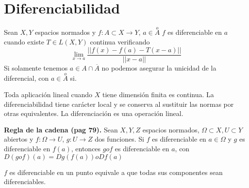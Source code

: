 \section{Diferenciabilidad}
Sean $X,Y$ espacios normados y $f:A\subset X\rightarrow Y$, $a\in\overset{o}{A}$ $f$ es diferenciable en $a$ cuando existe $T\in L(X,Y)$ continua verificando
$$ \lim_{x\rightarrow a} \frac{||f(x)-f(a)-T(x-a)||}{||x-a||}$$
Si solamente tenemos $a\in A\cap \overline{A}$ no podemos asegurar la unicidad de la diferencial, con $a\in\overset{o}{A}$ si.

Toda aplicación lineal cuando $X$ tiene dimensión finita es continua.
La diferenciabilidad tiene carácter local y se conserva al sustituir las normas por otras equivalentes.
La diferenciación es una operación lineal.

\textbf{Regla de la cadena (pag 79).} Sean $X,Y,Z$ espacios normados, $\Omega\subset X, U\subset Y$ abiertos y $f:\Omega\rightarrow U$, $g:U\rightarrow Z$ dos funciones. Si $f$ es diferenciable en $a\in\Omega$ y $g$ es diferenciable en $f(a)$, entonces $gof$ es diferenciable en $a$, con $D(gof)(a) = Dg(f(a))oDf(a)$

$f$ es diferenciable en un punto equivale a que todas sus componentes sean diferenciables.
